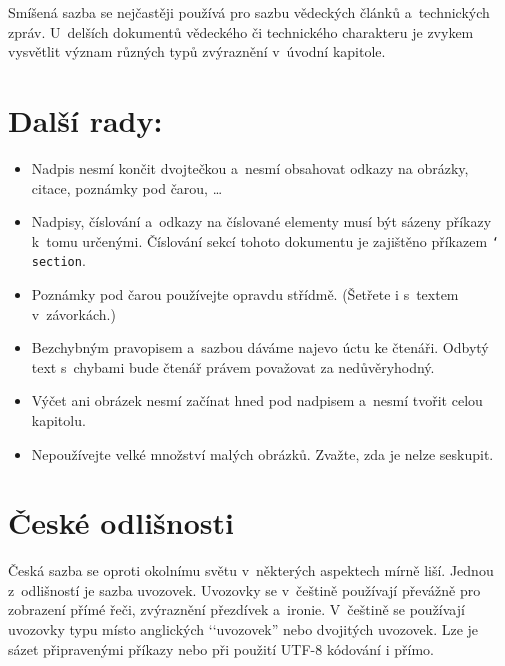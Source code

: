 \documentclass[a4paper, 10pt, twocolumn]{article}
\begin{document}
  Smíšená sazba se nejčastěji používá pro sazbu vědec\-kých článků a~technických zpráv.
  U~delších dokumentů vědeckého či technického charakteru je zvykem vysvětlit význam různých typů zvýraznění v~úvodní kapitole.  
  
  \section{Další rady:}

  \begin{itemize}
    \item Nadpis nesmí končit dvojtečkou a~nesmí obsahovat odkazy na obrázky, citace, poznámky pod čarou, \dots

    \item Nadpisy, číslování a~odkazy na číslované elementy musí být sázeny příkazy k~tomu určenými.
    Číslo\-vání sekcí tohoto dokumentu je zajištěno příkazem \texttt{\char`\\section}.

    \item Poznámky pod čarou\footnotemark{} používejte opravdu střídmě.
    (Šetřete i s~textem v~závorkách.)

    \item Bezchybným pravopisem a~sazbou dáváme najevo úctu ke čtenáři.
    Odbytý text s~chybami bude čtenář právem považovat za nedůvěryhodný.

    \item Výčet ani obrázek nesmí začínat hned pod nadpisem a~nesmí tvořit celou kapitolu.

    \item Nepoužívejte velké množství malých obrázků.
    Zvažte, zda je nelze seskupit.
  \end{itemize}

  \section{České odlišnosti}

  Česká sazba se oproti okolnímu světu v~některých aspek\-tech mírně liší.
  Jednou z~odlišností je sazba uvozovek.
  Uvozovky se v~češtině používají převážně pro zobrazení přímé řeči, zvýraznění přezdívek a~ironie.
  V~češtině se používají uvozovky typu  místo anglických ‘‘uvozovek” nebo dvojitých \textquotedbl{}uvozovek\textquotedbl{}.
  Lze je sázet připravenými příkazy nebo při použití UTF-8 kódování i přímo.
\end{document}
